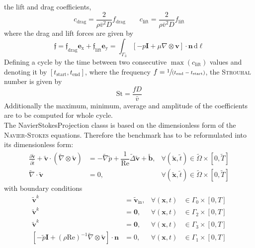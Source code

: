 \documentclass[]{scrartcl}
\newcommand{\pfrac}[2]{\frac{\partial #1}{\partial #2}}
\renewcommand{\d}{\,\mathrm{d}}
\newcommand{\bs}[1]{\boldsymbol{#1}}
\begin{document}
the lift and drag coefficients,
\begin{equation*}
	c_\textrm{drag} = \dfrac{2}{\rho\bar{v}^2D} f_\textrm{drag}
	\qquad
	c_\textrm{lift} = \dfrac{2}{\rho\bar{v}^2D} f_\textrm{lift}
\end{equation*}
where the drag and lift forces are given by
\begin{equation*}
	 \bs{\mathfrak{f}} = \mathfrak{f}_\textrm{drag}  \mathbf{e}_\textrm{x} +  \mathfrak{f}_\textrm{lift} \mathbf{e}_\textrm{y} =
	 \int_{\Gamma_3} [-p\mathbf{I} + \mu \nabla \otimes \mathbf{v}] \cdot \mathbf{n} \d \ell
\end{equation*}
Defining a cycle by the time between two consecutive $\max(c_\textrm{lift})$ values and denoting it by $[t_\textrm{start}, t_\textrm{end}]$, where the frequency $f = \sfrac{1}{(t_\textrm{end} - t_\textrm{start})}$, the \textsc{Strouhal} number is given by
\begin{equation*}
	\textrm{St} = \dfrac{fD}{\bar{v}}
\end{equation*}
Additionally the maximum, minimum, average and amplitude of the coefficients are to be computed for whole cycle.
\\
The NavierStokesProjection classs is based on the dimensionless form of the \textsc{Navier-Stokes} equations. Therefore the benchmark has to be reformulated into its dimensionless form:
\begin{equation*}
	\begin{aligned}
		\pfrac{\mathbf{\tilde{v}}}{\tilde{t}} + \mathbf{\tilde{v}} \cdot (\tilde{\nabla} \otimes \mathbf{\tilde{v}})&=  -\tilde{\nabla} \tilde{p}+ \dfrac{1}{\mathrm{Re}}\tilde{\Delta} \mathbf{\tilde{v}} + \mathbf{\tilde{b}}, &\forall (\mathbf{\tilde{x}}, \tilde{t}) \in \tilde{\Omega} \times [0, \tilde{T} ] \\
		\tilde{\nabla} \cdot \mathbf{\tilde{v}}&= 0, &\forall (\mathbf{\tilde{x}}, \tilde{t}) \in\tilde{ \Omega} \times  [0, \tilde{T} ]
	\end{aligned}
\end{equation*}
with boundary conditions
\begin{equation*}
	\begin{aligned}
		\mathbf{\tilde{v}}^{k} &= \mathbf{\tilde{v}}_\textrm{in},  &\forall(\mathbf{x}, t) &\in \Gamma_0 \times [0, T] \\
		\mathbf{\tilde{v}}^{k} &= \mathbf{0}, &\forall(\mathbf{x}, t) &\in \Gamma_2 \times [0,T]\\
		\mathbf{\tilde{v}}^{k} &= \mathbf{0}, &\forall(\mathbf{x}, t) &\in \Gamma_3 \times [0, T] \\
		[-\tilde{p}\mathbf{I} + (\rho\textrm{Re})^{-1}\tilde{ \nabla} \otimes \mathbf{\tilde{v}}] \cdot \mathbf{n} &=0, &\forall(\mathbf{x}, t) &\in \Gamma_1 \times [0, T] \\
	\end{aligned}
\end{equation*}
\end{document}
